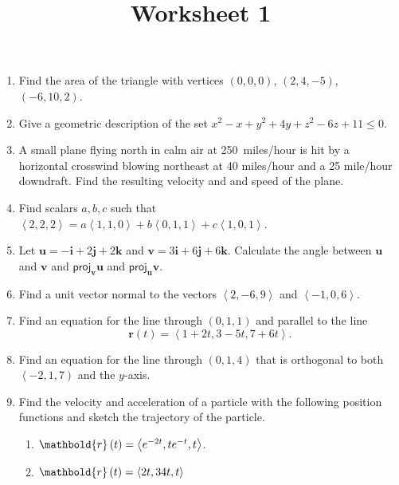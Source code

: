 \documentclass[12pt]{article}
\title{Worksheet 1}
\author{}\date{}
\let\sin\relax\DeclareMathOperator{\sin}{\mathsf{sin}}
\let\arctan\relax\DeclareMathOperator{\arctan}{\mathsf{arctan}}
\let\cos\relax\DeclareMathOperator{\cos}{\mathsf{cos}}
\begin{document}
\maketitle

\begin{enumerate}
\item Find the area of the triangle with vertices
$\left(0,0,0\right)$, $\left(2,4,-5\right)$,
$\left(-6,10,2\right)$. %
\item Give a geometric description of the set
$x^2-x+y^2+4y+z^2-6z+11\le 0$.
\item A small plane flying north in calm air at
250~miles/hour is hit by a horizontal crosswind blowing
northeast at 40 miles/hour and a 25 mile/hour downdraft.
Find the resulting velocity and and speed of the plane.
\item Find scalars $a,b,c$ such that
$\left\langle 2,2,2\right\rangle
=a\left\langle 1,1,0\right\rangle
+b\left\langle 0,1,1\right\rangle
+c\left\langle 1,0,1\right\rangle$.
\item Let $\mathbold{u}=-\mathbold{i}+2\mathbold{j}+2\mathbold{k}$
and $\mathbold{v}=3\mathbold{i}+6\mathbold{j}+6\mathbold{k}$.
Calculate the angle between $\mathbold{u}$ and $\mathbold{v}$
and $\mathsf{proj}_\mathbold{v}\mathbold{u}$
and $\mathsf{proj}_\mathbold{u}\mathbold{v}$.
\item Find a unit vector normal to the vectors
$\left\langle 2,-6,9\right\rangle$ and
$\left\langle -1,0,6\right\rangle$.
\item Find an equation for the line through
$\left(0,1,1\right)$ and parallel to the line
\[\mathbold{r}\left(t\right)=\left\langle
1+2t,3-5t,7+6t\right\rangle.\]
\item Find an equation for the line through
$\left(0,1,4\right)$ that is orthogonal to both
$\left\langle -2,1,7\right)$ and the $y$-axis.
\item Find the velocity and acceleration of
a particle with the following position
functions and sketch the trajectory
of the particle.
\begin{enumerate}
\item $\mathbold{r}\left(t\right)=\left\langle
e^{-2t},te^{-t},\arctan{t}\right\rangle$.
\item $\mathbold{r}\left(t\right)=\left\langle
\sin{2t},3\cos{4t},t\right\rangle$
\end{enumerate}
\end{enumerate}
\end{document}
